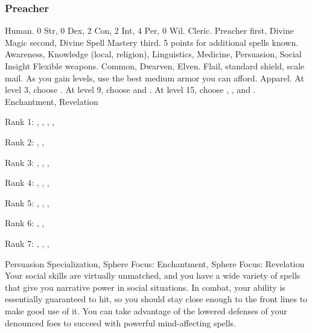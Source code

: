         \subsubsection{Preacher}
             Human.
             0 Str, 0 Dex, 2 Con, 2 Int, 4 Per, 0 Wil.
             Cleric.
             Preacher first, Divine Magic second, Divine Spell Mastery third.
             5 points for additional spells known.
             Awareness, Knowledge (local, religion), Linguistics, Medicine, Persuasion, Social Insight
             Flexible weapons.
             Common, Dwarven, Elven.
             Flail, standard shield, scale mail. As you gain levels, use the best medium armor you can afford.
             Apparel.
                At level 3, choose .
                At level 9, choose  and .
                At level 15, choose , , and .
             Enchantment, Revelation
            \begin{raggeditemize}
                \item Rank 1: , , , , 
                \item Rank 2: , , 
                \item Rank 3: , , , 
                \item Rank 4: , , , 
                \item Rank 5: , , , 
                \item Rank 6: , , 
                \item Rank 7: , , , 
            \end{raggeditemize}
             Persuasion Specialization, Sphere Focus: Enchantment, Sphere Focus: Revelation
             Your social skills are virtually unmatched, and you have a wide variety of spells that give you narrative power in social situations.
            In combat, your  ability is essentially guaranteed to hit, so you should stay close enough to the front lines to make good use of it.
            You can take advantage of the lowered defenses of your denounced foes to succeed with powerful mind-affecting spells.

